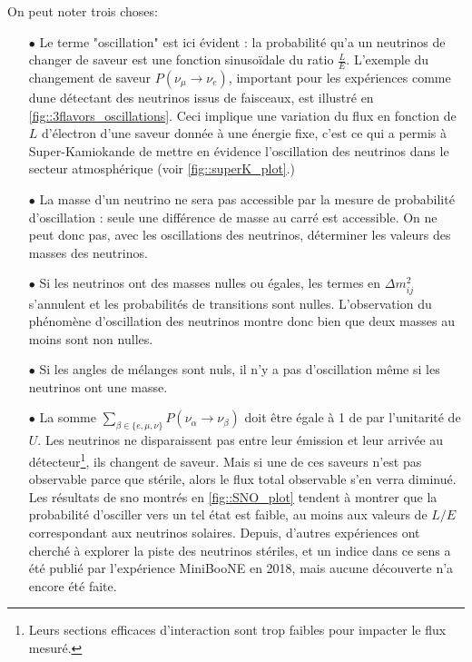         On peut noter trois choses:
        \begin{itemize}
          \item[$\bullet$] Le terme "oscillation" est ici évident : la probabilité qu'a un neutrinos de changer de saveur est une fonction sinusoïdale du ratio $\frac{L}{E}$. L'exemple du changement de saveur $P(\nu_{\mu}\to\nu_e)$, important pour les expériences comme \gls{dune} détectant des neutrinos issus de faisceaux, est illustré en \autoref{fig::3flavors_oscillations}. Ceci implique une variation du flux en fonction de $L$ d'électron d'une saveur donnée à une énergie fixe, c'est ce qui a permis à Super-Kamiokande de mettre en évidence l'oscillation des neutrinos dans le secteur atmosphérique (voir \autoref{fig::superK_plot}.)
          \item[$\bullet$] La masse d'un neutrino ne sera pas accessible par la mesure de probabilité d'oscillation : seule une différence de masse au carré est accessible. On ne peut donc pas, avec les oscillations des neutrinos, déterminer les valeurs des masses des neutrinos.
          \item[$\bullet$] Si les neutrinos ont des masses nulles ou égales, les termes en $\Delta m_{ij}^2$ s'annulent et les probabilités de transitions sont nulles. L'observation du phénomène d'oscillation des neutrinos montre donc bien que deux masses au moins sont non nulles.
          \item[$\bullet$] Si les angles de mélanges sont nuls, il n'y a pas d'oscillation même si les neutrinos ont une masse.
          \item[$\bullet$] La somme $\sum_{\beta\in\{e,\mu,\nu\}}P(\nu_{\alpha}\to\nu_{\beta})$ doit être égale à 1 de par l'unitarité de $U$. Les neutrinos ne disparaissent pas entre leur émission et leur arrivée au détecteur\footnote{Leurs sections efficaces d'interaction sont trop faibles pour impacter le flux mesuré.}, ils changent de saveur. Mais si une de ces saveurs n'est pas observable parce que stérile, alors le flux total observable s'en verra diminué. Les résultats de \gls{sno} montrés en \autoref{fig::SNO_plot} tendent à montrer que la probabilité d'osciller vers un tel état est faible, au moins aux valeurs de $L/E$ correspondant aux neutrinos solaires. Depuis, d'autres expériences ont cherché à explorer la piste des neutrinos stériles, et un indice dans ce sens a été publié par l'expérience MiniBooNE\cite{Arevalo2018} en 2018, mais aucune découverte n'a encore été faite.
        \end{itemize}



